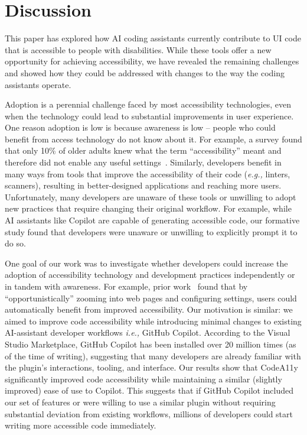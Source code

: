 \section{Discussion}
\label{discuss}
\begin{comment}
Unremarkable AI:
by augmenting the users’ routines technology/AI can have signifcant importance for the users yet remain unobtrusive
https://dl.acm.org/doi/pdf/10.1145/3290605.3300468
\end{comment}

This paper has explored how AI coding assistants currently contribute to UI code that is accessible to people with disabilities. While these tools offer a new opportunity for achieving accessibility, we have revealed the remaining challenges and showed how they could be addressed with changes to the way the coding assistants operate.

Adoption is a perennial challenge faced by most accessibility technologies, even when the technology could lead to substantial improvements in user experience.
One reason adoption is low is because awareness is low -- people who could benefit from access technology do not know about it. For example, a survey found that only 10\% of older adults knew what the term ``accessibility'' meant and therefore did not enable any useful settings~\cite{wu2021can,peng2019personaltouch}.
Similarly, developers benefit in many ways from tools that improve the accessibility of their code (\textit{e.g.,} linters, scanners), resulting in better-designed applications and reaching more users. Unfortunately, many developers are unaware of these tools or unwilling to adopt new practices that require changing their original workflow.
For example, while AI assistants like Copilot are capable of generating accessible code, our formative study found that developers were unaware or unwilling to explicitly prompt it to do so.

One goal of our work was to investigate whether developers could increase the adoption of accessibility technology and development practices independently or in tandem with awareness.
For example, prior work~\cite{bigham2014making} found that by ``opportunistically'' zooming into web pages and configuring settings, users could automatically benefit from improved accessibility.
Our motivation is similar: we aimed to improve code accessibility while introducing minimal changes to existing AI-assistant developer workflows \textit{i.e.,} GitHub Copilot.
According to the Visual Studio Marketplace, GitHub Copilot has been installed over 20 million times (as of the time of writing), suggesting that many developers are already familiar with the plugin's interactions, tooling, and interface. 
Our results show that CodeA11y significantly improved code accessibility while maintaining a similar (slightly improved) ease of use to Copilot.
This suggests that if GitHub Copilot included our set of features or were willing to use a similar plugin without requiring substantial deviation from existing workflows, millions of developers could start writing more accessible code immediately.

